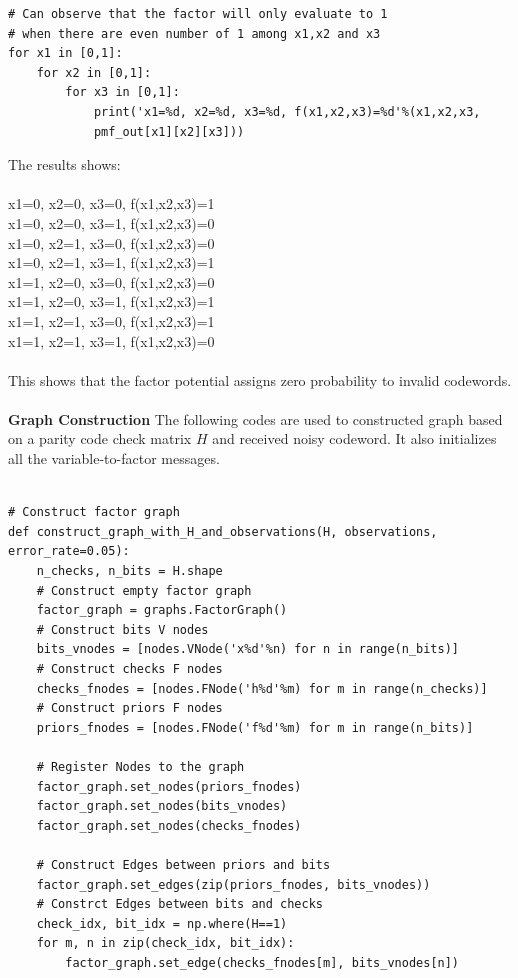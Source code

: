 \documentclass{article}
\begin{document}
\begin{enumerate}
\begin{enumerate}
\begin{verbatim}
# Can observe that the factor will only evaluate to 1 
# when there are even number of 1 among x1,x2 and x3
for x1 in [0,1]:
    for x2 in [0,1]:
        for x3 in [0,1]:
            print('x1=%d, x2=%d, x3=%d, f(x1,x2,x3)=%d'%(x1,x2,x3,
            pmf_out[x1][x2][x3]))
\end{verbatim}
The results shows:\\
\\
x1=0, x2=0, x3=0, f(x1,x2,x3)=1\\
x1=0, x2=0, x3=1, f(x1,x2,x3)=0\\
x1=0, x2=1, x3=0, f(x1,x2,x3)=0\\
x1=0, x2=1, x3=1, f(x1,x2,x3)=1\\
x1=1, x2=0, x3=0, f(x1,x2,x3)=0\\
x1=1, x2=0, x3=1, f(x1,x2,x3)=1\\
x1=1, x2=1, x3=0, f(x1,x2,x3)=1\\
x1=1, x2=1, x3=1, f(x1,x2,x3)=0\\
\\
This shows that the factor potential assigns zero probability to invalid codewords.\\\\
\textbf{Graph Construction}
The following codes are used to constructed graph based on a parity code check matrix $H$ and received noisy codeword. It also initializes all the variable-to-factor messages.\\\\
\begin{verbatim}
# Construct factor graph
def construct_graph_with_H_and_observations(H, observations, error_rate=0.05):
    n_checks, n_bits = H.shape
    # Construct empty factor graph
    factor_graph = graphs.FactorGraph()
    # Construct bits V nodes
    bits_vnodes = [nodes.VNode('x%d'%n) for n in range(n_bits)]
    # Construct checks F nodes
    checks_fnodes = [nodes.FNode('h%d'%m) for m in range(n_checks)]
    # Construct priors F nodes
    priors_fnodes = [nodes.FNode('f%d'%m) for m in range(n_bits)]
    
    # Register Nodes to the graph
    factor_graph.set_nodes(priors_fnodes)
    factor_graph.set_nodes(bits_vnodes)
    factor_graph.set_nodes(checks_fnodes)
    
    # Construct Edges between priors and bits
    factor_graph.set_edges(zip(priors_fnodes, bits_vnodes))
    # Constrct Edges between bits and checks
    check_idx, bit_idx = np.where(H==1)
    for m, n in zip(check_idx, bit_idx):
        factor_graph.set_edge(checks_fnodes[m], bits_vnodes[n])
    

\end{verbatim}
\end{enumerate}
\end{enumerate}
\end{document}

